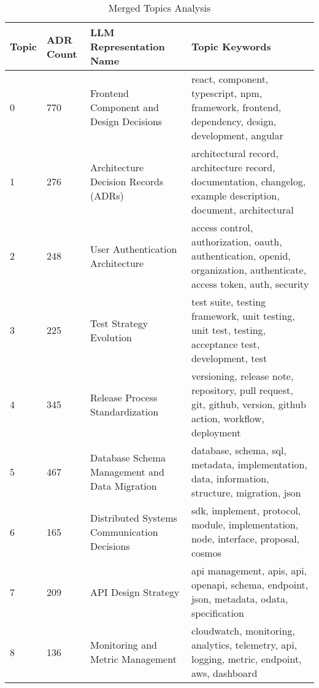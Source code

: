 \begin{longtable}{p{1cm} p{1.12cm} p{3.3cm} p{9cm}}
    \caption{Merged Topics Analysis} \\
    \hline
    \textbf{Topic} & \textbf{ADR Count} & \textbf{LLM Representation Name} & \textbf{Topic Keywords} \\
    \hline
    
    \endhead %
    
    
    \endfoot
    
    
    \endlastfoot
    
    0 & 770 & Frontend Component and Design Decisions & react, component, typescript, npm, framework, frontend, dependency, design, development, angular \\
    
    1 & 276 & Architecture Decision Records (ADRs) & architectural record, architecture record, documentation, changelog, example description, document, architectural \\
    
    2 & 248 & User Authentication Architecture & access control, authorization, oauth, authentication, openid, organization, authenticate, access token, auth, security \\
    
    3 & 225 & Test Strategy Evolution & test suite, testing framework, unit testing, unit test, testing, acceptance test, development, test \\
    
    4 & 345 & Release Process Standardization & versioning, release note, repository, pull request, git, github, version, github action, workflow, deployment \\
    
    5 & 467 & Database Schema Management and Data Migration & database, schema, sql, metadata, implementation, data, information, structure, migration, json \\
    
    6 & 165 & Distributed Systems Communication Decisions & sdk, implement, protocol, module, implementation, node, interface, proposal, cosmos \\
    
    7 & 209 & API Design Strategy & api management, apis, api, openapi, schema, endpoint, json, metadata, odata, specification \\
    
    8 & 136 & Monitoring and Metric Management & cloudwatch, monitoring, analytics, telemetry, api, logging, metric, endpoint, aws, dashboard \\
    

\end{longtable}
